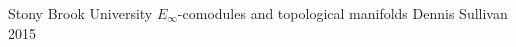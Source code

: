 
		{Stony Brook University}
		{$E_\infty$-comodules and topological manifolds}
		{Dennis Sullivan}
		{2015}
